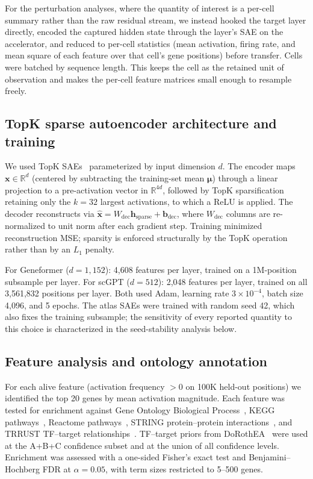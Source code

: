 For the perturbation analyses, where the quantity of interest is a per-cell summary rather than the
raw residual stream, we instead hooked the target layer directly, encoded the captured hidden state
through the layer's SAE on the accelerator, and reduced to per-cell statistics (mean activation,
firing rate, and mean square of each feature over that cell's gene positions) before transfer.
Cells were batched by sequence length. This keeps the cell as the retained unit of observation and
makes the per-cell feature matrices small enough to resample freely.

\subsection*{TopK sparse autoencoder architecture and training}

We used TopK SAEs~\cite{makhzani2013ksparse} parameterized by input dimension $d$. The encoder maps
$\mathbf{x} \in \mathbb{R}^{d}$ (centered by subtracting the training-set mean $\boldsymbol{\mu}$)
through a linear projection to a pre-activation vector in $\mathbb{R}^{4d}$, followed by TopK
sparsification retaining only the $k{=}32$ largest activations, to which a ReLU is applied. The
decoder reconstructs via $\hat{\mathbf{x}} = W_\text{dec}\mathbf{h}_\text{sparse} +
\mathbf{b}_\text{dec}$, where $W_\text{dec}$ columns are re-normalized to unit norm after each
gradient step. Training minimized reconstruction MSE; sparsity is enforced structurally by the TopK
operation rather than by an $L_1$ penalty.

For Geneformer ($d{=}1{,}152$): 4,608 features per layer, trained on a 1M-position subsample per
layer. For scGPT ($d{=}512$): 2,048 features per layer, trained on all 3,561,832 positions per
layer. Both used Adam, learning rate $3 \times 10^{-4}$, batch size 4,096, and 5 epochs. The atlas
SAEs were trained with random seed 42, which also fixes the training subsample; the sensitivity of
every reported quantity to this choice is characterized in the seed-stability analysis below.

\subsection*{Feature analysis and ontology annotation}

For each alive feature (activation frequency $> 0$ on 100K held-out positions) we identified the
top 20 genes by mean activation magnitude. Each feature was tested for enrichment against Gene
Ontology Biological Process~\cite{ashburner2000go}, KEGG pathways~\cite{kanehisa2000kegg}, Reactome
pathways~\cite{jassal2020reactome}, STRING protein--protein interactions~\cite{szklarczyk2023string},
and TRRUST TF--target relationships~\cite{han2018trrust}. TF--target priors from
DoRothEA~\cite{garcia-alonso2019dorothea} were used at the A+B+C confidence subset and at the union
of all confidence levels. Enrichment was assessed with a one-sided Fisher's exact test and
Benjamini--Hochberg FDR at $\alpha = 0.05$, with term sizes restricted to 5--500 genes.


